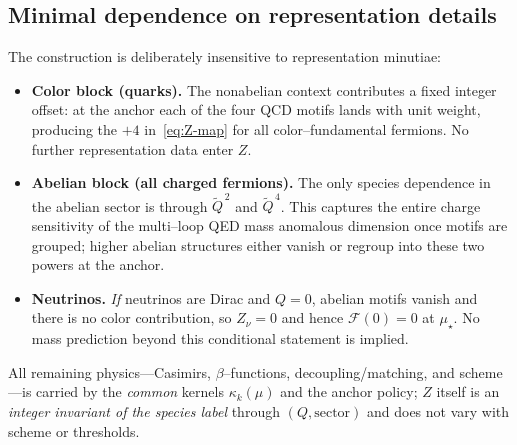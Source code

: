 \documentclass[aps,prd,onecolumn,amsmath,amssymb,superscriptaddress,nofootinbib,showpacs,showkeys]{revtex4-2}
\begin{document}
\subsection{Minimal dependence on representation details}\label{sec:minimal-rep}
The construction is deliberately insensitive to representation minutiae:
\begin{itemize}
  \item \textbf{Color block (quarks).} The nonabelian context contributes a fixed integer offset: at the anchor each of the four QCD motifs lands with unit weight, producing the $+4$ in~\ref{eq:Z-map} for all color--fundamental fermions. No further representation data enter $Z$.
  \item \textbf{Abelian block (all charged fermions).} The only species dependence in the abelian sector is through $\tilde Q^{\,2}$ and $\tilde Q^{\,4}$. This captures the entire charge sensitivity of the multi--loop QED mass anomalous dimension once motifs are grouped; higher abelian structures either vanish or regroup into these two powers at the anchor.
  \item \textbf{Neutrinos.} \emph{If} neutrinos are Dirac and $Q=0$, abelian motifs vanish and there is no color contribution, so $Z_\nu=0$ and hence $\mathcal F(0)=0$ at $\mu_\star$. No mass prediction beyond this conditional statement is implied.
\end{itemize}
All remaining physics—Casimirs, $\beta$--functions, decoupling/matching, and scheme—is carried by the \emph{common} kernels $\kappa_k(\mu)$ and the anchor policy; $Z$ itself is an \emph{integer invariant of the species label} through $(Q,\text{sector})$ and does not vary with scheme or thresholds.
\end{document}
